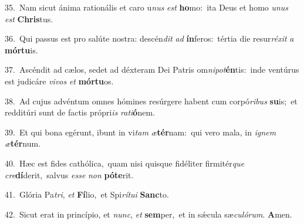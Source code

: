 {\numbfont\textcolor{\numbcolor}{35.}}~Nam sicut ánima rationális et caro u\textit{nus} \textit{est} \textbf{ho}\-mo:~\star ita Deus et homo \textit{u}\-\textit{nus} \textit{est} \textbf{Chris}\-tus.\par
{\numbfont\textcolor{\numbcolor}{36.}}~Qui passus est pro salúte nostra: descén\textit{dit} \textit{ad} \textbf{ín}\-feros:~\star tértia die resur\-\textit{ré}\-\textit{xit} \textit{a} \textbf{mór}\-\textbf{tu}is.\par
{\numbfont\textcolor{\numbcolor}{37.}}~Ascéndit ad cælos, sedet ad déxteram Dei Patris om\-\textit{ni}\-\textit{pot}\textbf{én}tis:~\star inde ventúrus est judicáre \textit{vi}\-\textit{vos} \textit{et} \textbf{mór}\-\textbf{tu}os.\par
{\numbfont\textcolor{\numbcolor}{38.}}~Ad cujus advéntum omnes hómines resúrgere habent cum corpó\-\textit{ri}\-\textit{bus} \textbf{su}\-is;~\star et redditúri sunt de factis própri\textit{is} \textit{ra}\-\textit{ti}\textbf{ó}nem.\par
{\numbfont\textcolor{\numbcolor}{39.}}~Et qui bona egérunt, ibunt in vi\textit{tam} \textit{æ}\-\textbf{tér}nam:~\star qui vero mala, in \textit{i}\-\textit{gnem} \textit{æ}\-\textbf{tér}num.\par
{\numbfont\textcolor{\numbcolor}{40.}}~Hæc est fides cathólica,~\dagger quam nisi quisque fidéliter firmitér\textit{que} \textit{cre}\-\textbf{dí}derit,~\star salvus \textit{es}\-\textit{se} \textit{non} \textbf{pót}\-\textbf{e}rit.\par
{\numbfont\textcolor{\numbcolor}{41.}}~Glória Pa\-\textit{tri}\-, \textit{et} \textbf{Fí}\-lio,~\star et Spi\-\textit{rí}\-\textit{tu}\textit{i} \textbf{Sanc}\-to.\par
{\numbfont\textcolor{\numbcolor}{42.}}~Sicut erat in princípio, et \textit{nunc}\-, \textit{et} \textbf{sem}\-per,~\star et in sǽcula sæ\-\textit{cu}\-\textit{ló}\textit{rum}. \textbf{A}\-men.\par
